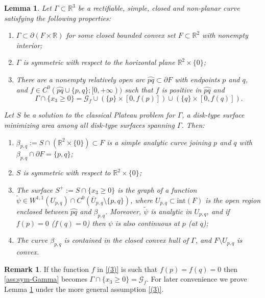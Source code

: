 \documentclass[JEP,XML,SOM,Unicode, NoFloatCountersInSection,published]{cedram}
\newcommand{\R}{\mathbb{R}}
\let\arc\wideparen
\newtheorem{lemma}[theorem]{Lemma}
\theoremstyle{definition}
\newtheorem{remark}[theorem]{Remark}
\begin{document}
\begin{lemma}\label{lem:plateau_solution}
Let $\Gamma \subset \R^3$
be a rectifiable, simple, closed and non-planar
curve satisfying the following properties:
\begin{enumerate}[label=$(\arabic*)$,wide]
\item \label{(1)}$\Gamma\subset\partial(F\times\R)$ for some closed bounded convex set $F\subset\R^2$ with nonempty interior;
\item \label{(2)}$\Gamma$ is symmetric with respect to the horizontal plane $\R^2\times\{0\}$;
\item \label{(3)} There are a nonempty
relatively open arc $\arc{pq}\subset\partial F$ with endpoints $p$ and $q$, and
$f\in C^0( \arc{pq}\cup\{p,q\};[0,+\infty))$ such that $f$ is positive in $\arc{pq}$ and
\begin{equation}\label{ass:sym-Gamma}
\Gamma\cap\{x_3\ge0\}=\mathcal{G}_f\cup (\{p\}\times[0,f(p)])\cup (\{q\}\times[0,f(q)]).
\end{equation}
\end{enumerate}
Let $S$ be a solution to the
classical Plateau problem for $\Gamma$, \ie a disk-type surface
minimizing area among all disk-type surfaces spanning $\Gamma$.
Then:
\begin{enumerate}[label=$(\arabic*')$,wide]
\item \label{1'}$\beta_{p,q}:=S\cap (\R^2\times\{0\})\subset F$
is a simple analytic curve joining $p$ and $q$ with $\beta_{p,q}\cap\partial F=\{p,q\}$;
\item\label{2'} $S$ is symmetric with respect to $\R^2\times\{0\}$;
\item \label{3'}The surface $S^+:=S\cap\{x_3\ge0\}$ is the graph of a
function { $\widetilde \psi\in W^{1,1}(U_{p,q})\cap C^0(\overline{U}_{p,q}\setminus{\{p,q\}})$}, where $U_{p,q}\subset\mathrm{int} (F)$ is the open region enclosed between $\arc{pq}$ and $\beta_{p,q}$. Moreover, $\widetilde\psi$ is analytic in $U_{p,q}$, { and if $f(p)=0$ (\resp $f(q)=0$) then $\psi$ is also continuous at $p$ (\resp at $q$);}
\item \label{4'}The curve $\beta_{p,q}$ is contained in the closed
convex hull of $\Gamma$, and $F\setminus U_{p,q}$ is convex.
\end{enumerate}
\end{lemma}

\begin{remark}
If the function $f$ in \ref{(3)} is such that $f(p)=f(q)=0$ then \eqref{ass:sym-Gamma} becomes $\Gamma\cap\{x_3\ge0\}=\mathcal{G}_f$.
For later convenience we prove Lemma \ref{lem:plateau_solution} under the more general assumption \ref{(3)}.
\end{remark}
\end{document}
